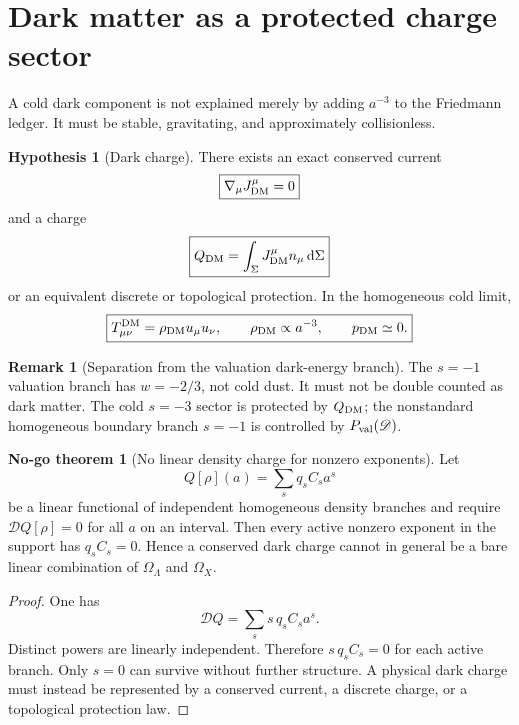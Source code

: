 \documentclass[aps,prd,reprint,nofootinbib,superscriptaddress,floatfix]{revtex4-2}
\numberwithin{equation}{section}
\theoremstyle{definition}
\newtheorem{hypothesis}{Hypothesis}[section]
\newtheorem{remark}{Remark}[section]
\newtheorem{nogotheorem}{No-go theorem}[section]
\theoremstyle{plain}
\newcommand{\dd}{\mathrm d}
\newcommand{\Dil}{\mathscr D}
\begin{document}
\section{Dark matter as a protected charge sector}

A cold dark component is not explained merely by adding \(a^{-3}\) to the Friedmann ledger.  It must be stable, gravitating, and approximately collisionless.

\begin{hypothesis}[Dark charge]\label{hyp:dark-charge}
There exists an exact conserved current
\begin{equation}
\boxed{
\nabla_\mu J^\mu_{\rm DM}=0
}
\end{equation}
and a charge
\begin{equation}
\boxed{
Q_{\rm DM}=\int_\Sigma J^\mu_{\rm DM}n_\mu\,\dd\Sigma
}
\end{equation}
or an equivalent discrete or topological protection.  In the homogeneous cold limit,
\begin{equation}
\boxed{
T^{\rm DM}_{\mu\nu}=\rho_{\rm DM}u_\mu u_\nu,
\qquad
\rho_{\rm DM}\propto a^{-3},
\qquad
p_{\rm DM}\simeq0.
}
\end{equation}
\end{hypothesis}

\begin{remark}[Separation from the valuation dark-energy branch]
The \(s=-1\) valuation branch has \(w=-2/3\), not cold dust.  It must not be double counted as dark matter.  The cold \(s=-3\) sector is protected by \(Q_{\rm DM}\); the nonstandard homogeneous boundary branch \(s=-1\) is controlled by \(P_{\rm val}(\Dil)\).
\end{remark}


\begin{nogotheorem}[No linear density charge for nonzero exponents]\label{nogo:linear-density-charge}
Let
\[
Q[\rho](a)=\sum_s q_sC_sa^s
\]
be a linear functional of independent homogeneous density branches and require \(\Dil Q[\rho]=0\) for all \(a\) on an interval.  Then every active nonzero exponent in the support has \(q_sC_s=0\).  Hence a conserved dark charge cannot in general be a bare linear combination of \(\Omega_\Lambda\) and \(\Omega_X\).
\end{nogotheorem}

\begin{proof}
One has
\[
\Dil Q=\sum_s s\,q_sC_sa^s.
\]
Distinct powers are linearly independent.  Therefore \(s\,q_sC_s=0\) for each active branch.  Only \(s=0\) can survive without further structure.  A physical dark charge must instead be represented by a conserved current, a discrete charge, or a topological protection law.
\end{proof}
\end{document}
